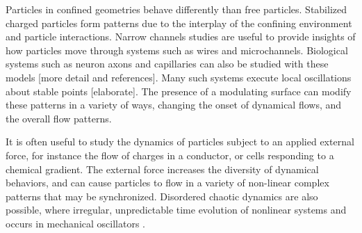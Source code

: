 \documentclass[prb,preprint]{revtex4}
\begin{document}
Particles in confined geometries behave differently than free particles.
Stabilized charged particles form patterns
due to the interplay of the confining environment
and particle interactions.
Narrow channels studies are useful to provide insights 
of how particles move through systems 
such as wires and microchannels.
Biological systems such as
neuron axons and capillaries can also be studied
with these models [more detail and references].
Many such systems execute local oscillations
about stable points [elaborate].
The presence of a modulating surface
can modify these patterns in a variety of ways,
changing the onset of dynamical flows,
and the overall flow patterns.
%

It is often useful to study the
dynamics of particles subject to 
an applied external force,
for instance the flow of charges in a conductor,
or cells responding to a chemical gradient.
The external force 
increases the diversity of dynamical behaviors,
and can cause particles to flow in
a variety of non-linear complex patterns
that may be 
synchronized.
Disordered chaotic dynamics are also possible,
where irregular, unpredictable time evolution of
nonlinear systems and occurs in mechanical oscillators \cite{chaos}.





\end{document}
